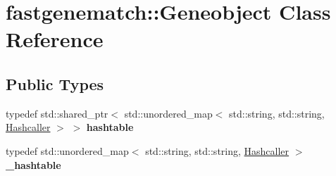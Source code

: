 \hypertarget{classfastgenematch_1_1Geneobject}{
\section{fastgenematch::Geneobject Class Reference}
\label{classfastgenematch_1_1Geneobject}
}
\subsection*{Public Types}
\begin{DoxyCompactItemize}
\item 
\hypertarget{classfastgenematch_1_1Geneobject_ad1dce72c4d21326253829528c921c97b}{
typedef std::shared\_\-ptr$<$ std::unordered\_\-map$<$ std::string, std::string, \hyperlink{classfastgenematch_1_1Hashcaller}{Hashcaller} $>$ $>$ {\bfseries hashtable}}
\label{classfastgenematch_1_1Geneobject_ad1dce72c4d21326253829528c921c97b}

\item 
\hypertarget{classfastgenematch_1_1Geneobject_ab900fe6b1116e8d5b4f2f62e7d45d1f7}{
typedef std::unordered\_\-map$<$ std::string, std::string, \hyperlink{classfastgenematch_1_1Hashcaller}{Hashcaller} $>$ {\bfseries \_\-hashtable}}
\label{classfastgenematch_1_1Geneobject_ab900fe6b1116e8d5b4f2f62e7d45d1f7}

\end{DoxyCompactItemize}
